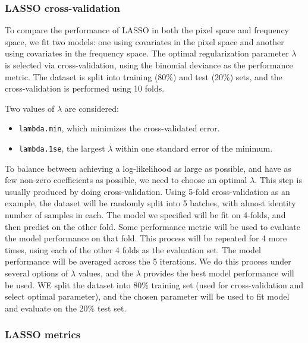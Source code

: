\documentclass[12pt]{article}
\begin{document}
\subsubsection{LASSO cross-validation}

To compare the performance of LASSO in both the pixel space and frequency space, we fit two models: one using covariates in the pixel space and another using covariates in the frequency space. The optimal regularization parameter \( \lambda \) is selected via cross-validation, using the binomial deviance as the performance metric. The dataset is split into training (80\%) and test (20\%) sets, and the cross-validation is performed using 10 folds.

Two values of \( \lambda \) are considered: 
\begin{itemize}
  \item \texttt{lambda.min}, which minimizes the cross-validated error.
  \item \texttt{lambda.1se}, the largest \( \lambda \) within one standard error of the minimum.
\end{itemize}

To balance between achieving a log-likelihood as large as possible, and have as few non-zero coefficients as possible, we need to choose an optimal \( \lambda \). This step is usually produced by doing cross-validation. Using 5-fold cross-validation as an example, the dataset will be randomly split into 5 batches, with almost identity number of samples in each. The model we specified will be fit on 4-folds, and then predict on the other fold. Some performance metric will be used to evaluate the model performance on that fold. This process will be repeated for 4 more times, using each of the other 4 folds as the evaluation set. The model performance will be averaged across the 5 iterations. We do this process under several options of \( \lambda \) values, and the \( \lambda \) provides the best model performance will be used. WE split the dataset into 80\% training set (used for cross-validation and select optimal parameter), and the chosen parameter will be used to fit model and evaluate on the 20\% test set.

\subsubsection{LASSO metrics}
\end{document}
